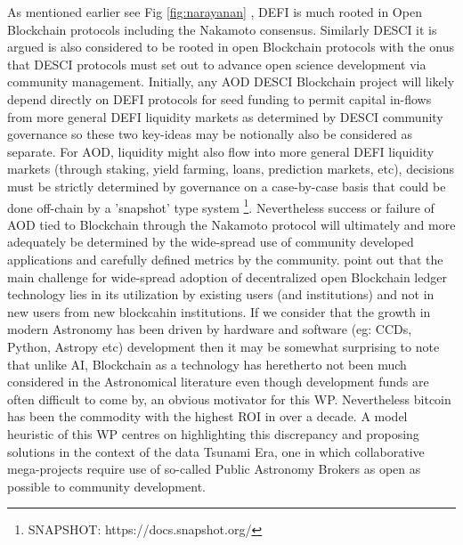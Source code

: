 \documentclass[final,5p,times,twocolumn,authoryear]{elsarticle}
\begin{document}
As mentioned earlier see  Fig \ref{fig:narayanan}
, DEFI is much rooted in Open Blockchain protocols including the Nakamoto consensus. Similarly DESCI it is argued is also considered to be rooted in open Blockchain protocols with the onus that DESCI protocols must set out to advance open science development via community management. Initially, any AOD DESCI Blockchain project will likely depend directly on DEFI protocols for seed funding to permit capital in-flows from more general DEFI liquidity markets as determined by DESCI community governance so these two key-ideas may be notionally also be considered as separate. For AOD, liquidity might also flow into more general DEFI liquidity markets (through staking, yield farming, loans, prediction markets, etc), decisions must be strictly determined by governance on a case-by-case basis that could be done off-chain by a 'snapshot' type system \footnote{SNAPSHOT: https://docs.snapshot.org/}. Nevertheless success or failure of AOD tied to Blockchain through the Nakamoto protocol will ultimately and more adequately be determined by the wide-spread use of community developed applications and carefully defined metrics by the community. \cite{arvindandclark2017} point out that the main challenge for wide-spread adoption of decentralized open Blockchain ledger technology lies in its utilization by existing users (and institutions) and not in new users from new blockcahin institutions. If we consider that the growth in modern Astronomy has been driven by hardware and software (eg: CCDs, Python, Astropy etc) development then it may be somewhat surprising to note that unlike AI, Blockchain as a technology has heretherto not been much considered in the Astronomical literature even though development funds are often difficult to come by, an obvious motivator for this WP. Nevertheless bitcoin has been the commodity with the highest ROI in over a decade.  A model heuristic of this WP centres on highlighting this discrepancy and proposing solutions in the context of the data Tsunami Era, one in which collaborative mega-projects require use of so-called Public Astronomy Brokers  as open as possible to community development.  
\end{document}

